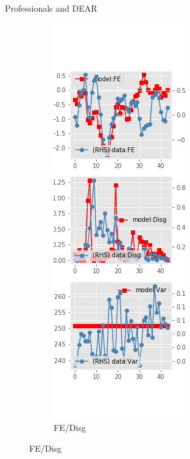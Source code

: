 \documentclass{beamer}
\begin{document}
\begin{frame}{Professionals and DEAR}
\begin{figure}[ht]
\begin{subfigure}[b]{0.2\textwidth}
		\end{subfigure}
		\hfill
		\begin{subfigure}[b]{0.2\textwidth}
			\caption{FE/Disg}
			\includegraphics[width=\textwidth, height = 0.8\textheight]{figuresDraft/spf_de_est_diag2.png}
		\end{subfigure}
	\end{figure}
\end{frame}
\end{document}
